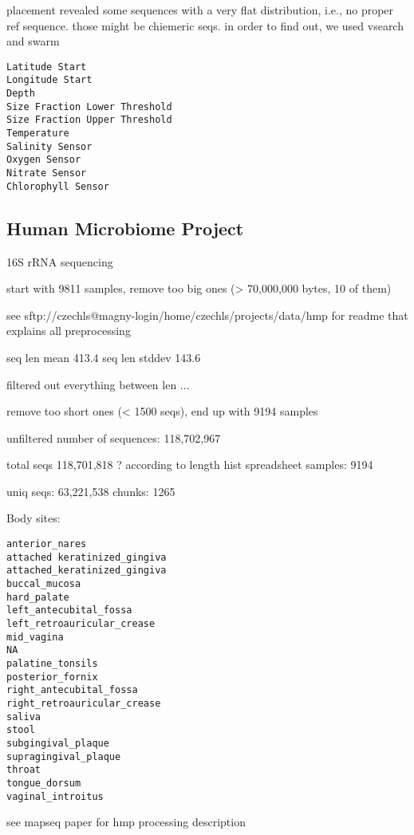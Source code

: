 placement revealed some sequences with a very flat distribution, i.e., no proper ref sequence.
those might be chiemeric seqs. in order to find out, we used vsearch and swarm

\begin{verbatim}
Latitude Start
Longitude Start
Depth
Size Fraction Lower Threshold
Size Fraction Upper Threshold
Temperature
Salinity Sensor
Oxygen Sensor
Nitrate Sensor
Chlorophyll Sensor
\end{verbatim}


\subsection{Human Microbiome Project}
\label{sec:MetagenomicDatasets:sub:HumanMicrobiomeProject}

16S rRNA sequencing

start with 9811 samples, remove too big ones (> 70,000,000 bytes, 10 of them)

see sftp://czechls@magny-login/home/czechls/projects/data/hmp
for readme that explains all preprocessing

seq len mean 413.4
seq len stddev 143.6

filtered out everything between len ...

remove too short ones (< 1500 seqs), end up with 9194 samples

unfiltered number of sequences: 118,702,967

total seqs 118,701,818 ? according to length hist spreadsheet
samples: 9194

uniq seqs: 63,221,538
chunks: 1265

Body sites:

\begin{verbatim}
anterior_nares
attached keratinized_gingiva
attached_keratinized_gingiva
buccal_mucosa
hard_palate
left_antecubital_fossa
left_retroauricular_crease
mid_vagina
NA
palatine_tonsils
posterior_fornix
right_antecubital_fossa
right_retroauricular_crease
saliva
stool
subgingival_plaque
supragingival_plaque
throat
tongue_dorsum
vaginal_introitus
\end{verbatim}

see mapseq paper for hmp processing description


